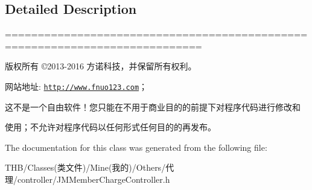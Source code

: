 \subsection{Detailed Description}
============================================================================

版权所有 ©2013-\/2016 方诺科技，并保留所有权利。

网站地址\+: \href{http://www.fnuo123.com}{\tt http\+://www.\+fnuo123.\+com}； 



这不是一个自由软件！您只能在不用于商业目的的前提下对程序代码进行修改和

使用；不允许对程序代码以任何形式任何目的的再发布。 

 

The documentation for this class was generated from the following file\+:\begin{DoxyCompactItemize}
\item 
T\+H\+B/\+Classes(类文件)/\+Mine(我的)/\+Others/代理/controller/J\+M\+Member\+Charge\+Controller.\+h\end{DoxyCompactItemize}
